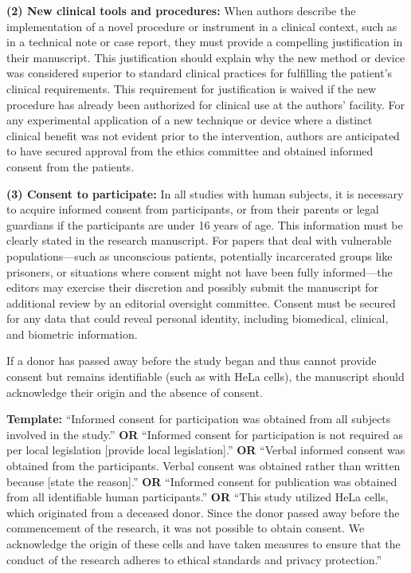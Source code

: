 \documentclass[12pt,a4paper]{article}
\begin{document}
\textbf{(2) New clinical tools and procedures:} When authors describe the implementation of a novel procedure or instrument in a clinical context, such as in a technical note or case report, they must provide a compelling justification in their manuscript. This justification should explain why the new method or device was considered superior to standard clinical practices for fulfilling the patient's clinical requirements. This requirement for justification is waived if the new procedure has already been authorized for clinical use at the authors’ facility. For any experimental application of a new technique or device where a distinct clinical benefit was not evident prior to the intervention, authors are anticipated to have secured approval from the ethics committee and obtained informed consent from the patients.

\textbf{(3) Consent to participate:} In all studies with human subjects, it is necessary to acquire informed consent from participants, or from their parents or legal guardians if the participants are under 16 years of age. This information must be clearly stated in the research manuscript. For papers that deal with vulnerable populations—such as unconscious patients, potentially incarcerated groups like prisoners, or situations where consent might not have been fully informed—the editors may exercise their discretion and possibly submit the manuscript for additional review by an editorial oversight committee. Consent must be secured for any data that could reveal personal identity, including biomedical, clinical, and biometric information.

If a donor has passed away before the study began and thus cannot provide consent but remains identifiable (such as with HeLa cells), the manuscript should acknowledge their origin and the absence of consent.

\textbf{Template:} ``Informed consent for participation was obtained from all subjects involved in the study.'' \textbf{OR} ``Informed consent for participation is not required as per local legislation [provide local legislation].'' \textbf{OR} ``Verbal informed consent was obtained from the participants. Verbal consent was obtained rather than written because [state the reason].'' \textbf{OR} ``Informed consent for publication was obtained from all identifiable human participants.'' \textbf{OR} ``This study utilized HeLa cells, which originated from a deceased donor. Since the donor passed away before the commencement of the research, it was not possible to obtain consent. We acknowledge the origin of these cells and have taken measures to ensure that the conduct of the research adheres to ethical standards and privacy protection.''
\end{document}
